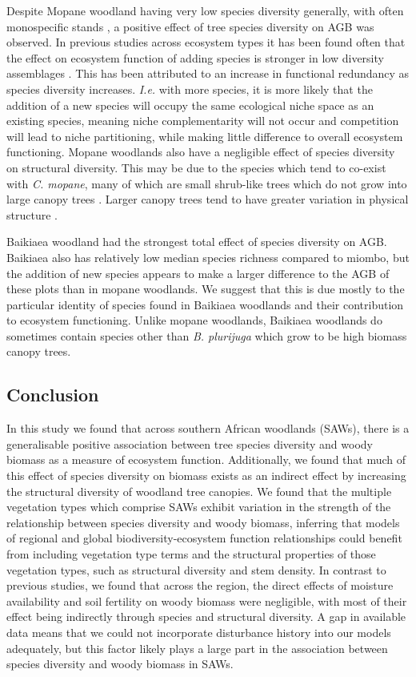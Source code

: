 \documentclass[11pt,a4paper]{article}
\begin{document}
Despite Mopane woodland having very low species diversity generally, with often monospecific stands \citep{Timberlake2010}, a positive effect of tree species diversity on AGB was observed. In previous studies across ecosystem types it has been found often that the effect on ecosystem function of adding species is stronger in low diversity assemblages \citep{Hector2007}. This has been attributed to an increase in functional redundancy as species diversity increases. \textit{I.e.} with more species, it is more likely that the addition of a new species will occupy the same ecological niche space as an existing species, meaning niche complementarity will not occur and competition will lead to niche partitioning, while making little difference to overall ecosystem functioning. Mopane woodlands also have a negligible effect of species diversity on structural diversity. This may be due to the species which tend to co-exist with \textit{C. mopane}, many of which are small shrub-like trees which do not grow into large canopy trees \citep{Timberlake2010}. Larger canopy trees tend to have greater variation in physical structure \citep{Seidel2019}.

Baikiaea woodland had the strongest total effect of species diversity on AGB. Baikiaea also has relatively low median species richness compared to miombo, but the addition of new species appears to make a larger difference to the AGB of these plots than in mopane woodlands. We suggest that this is due mostly to the particular identity of species found in Baikiaea woodlands and their contribution to ecosystem functioning. Unlike mopane woodlands, Baikiaea woodlands do sometimes contain species other than \textit{B. plurijuga} which grow to be high biomass canopy trees. 

\subsection*{Conclusion}

In this study we found that across southern African woodlands (SAWs), there is a generalisable positive association between tree species diversity and woody biomass as a measure of ecosystem function. Additionally, we found that much of this effect of species diversity on biomass exists as an indirect effect by increasing the structural diversity of woodland tree canopies. We found that the multiple vegetation types which comprise SAWs exhibit variation in the strength of the relationship between species diversity and woody biomass, inferring that models of regional and global biodiversity-ecosystem function relationships could benefit from including vegetation type terms and the structural properties of those vegetation types, such as structural diversity and stem density. In contrast to previous studies, we found that across the region, the direct effects of moisture availability and soil fertility on woody biomass were negligible, with most of their effect being indirectly through species and structural diversity. A gap in available data means that we could not incorporate disturbance history into our models adequately, but this factor likely plays a large part in the association between species diversity and woody biomass in SAWs.
\end{document}

